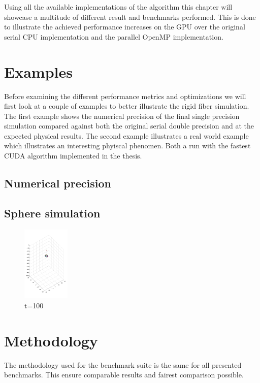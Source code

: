 \documentclass[a4paper,11pt]{kth-mag}
\begin{document}
Using all the available implementations of the algorithm this chapter will showcase a multitude of different result and benchmarks performed. This is done to illustrate the achieved performance increases on the GPU over the original serial CPU implementation and the parallel OpenMP implementation.

\section{Examples}

Before examining the different performance metrics and optimizations we will first look at a couple of examples to better illustrate the rigid fiber simulation. The first example shows the numerical precision of the final single precision simulation compared against both the original serial double precision and at the expected physical results. The second example illustrates a real world example which illustrates an interesting phyiscal phenomen. Both a run with the fastest CUDA algorithm implemented in the thesis.

\subsection{Numerical precision}
\subsection{Sphere simulation}

\begin{figure}
  \centering
  \includegraphics[width=0.2\textwidth]{img/sphere_00100.png}
  \caption{t=100}
  \label{fig:sphere_simulation}
\end{figure}

\section{Methodology}

The methodology used for the benchmark suite is the same for all presented benchmarks. This ensure comparable results and fairest comparison possible.
\end{document}
